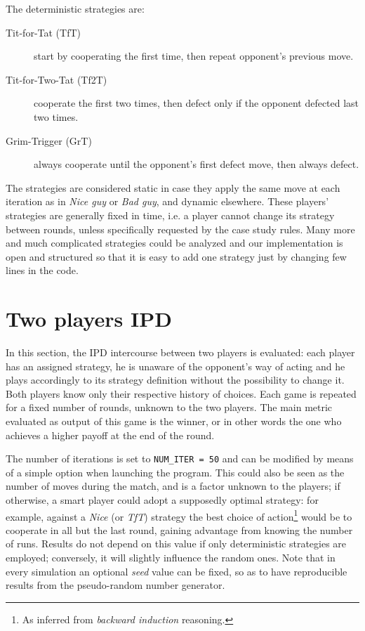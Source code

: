 \documentclass[journal,10pt,twoside]{IEEEtran}
\begin{document}
The deterministic strategies are:
\begin{description}
    \item[Tit-for-Tat (TfT)] start by cooperating the first time, then repeat opponent's previous move.
    \item[Tit-for-Two-Tat (Tf2T)] cooperate the first two times, then defect only if the opponent defected last two times.
    \item[Grim-Trigger (GrT)] always cooperate until the opponent's first defect move, then always defect. 
\end{description}

The strategies are considered static in case they apply the same move at each iteration as in \textit{Nice guy} or \textit{Bad guy}, and dynamic elsewhere.
These players' strategies are generally fixed in time, i.e. a player cannot change its strategy between rounds, unless specifically requested by the case study rules.
Many more and much complicated strategies could be analyzed and our implementation is open and structured so that it is easy to add one strategy just by changing few lines in the code.

\section{Two players IPD} \label{s:IPD2P}
In this section, the IPD intercourse between two players is evaluated: each player has an assigned strategy, he is unaware of the opponent's way of acting and he plays accordingly to its strategy definition without the possibility to change it. Both players know only their respective history of choices. Each game is repeated for a fixed number of rounds, unknown to the two players. The main metric evaluated as output of this game is the winner, or in other words the one who achieves a higher payoff at the end of the round.

The number of iterations is set to \texttt{NUM\_ITER = 50} and can be modified by means of a simple option when launching the program.
This could also be seen as the number of moves during the match, and is a factor unknown to the players; if otherwise, a smart player could adopt a supposedly optimal strategy: for example, against a \textit{Nice} (or \textit{TfT}) strategy the best choice of action\footnote{As inferred from \textit{backward induction} reasoning.} would be to cooperate in all but the last round, gaining advantage from knowing the number of runs.
Results do not depend on this value if only deterministic strategies are employed; conversely, it will slightly influence the random ones.
Note that in every simulation an optional \textit{seed} value can be fixed, so as to have reproducible results from the pseudo-random number generator.
\end{document}
